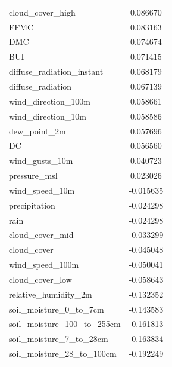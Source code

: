 \begin{table}[H]
\begin{tabular}{lc}
		cloud\_cover\_high                      & 0.086670    \\ 
		FFMC                                     & 0.083163    \\ 
		DMC                                      & 0.074674    \\ 
		BUI                                      & 0.071415    \\ 
		diffuse\_radiation\_instant             & 0.068179    \\ 
		diffuse\_radiation                      & 0.067139    \\ 
		wind\_direction\_100m                    & 0.058661    \\ 
		wind\_direction\_10m                     & 0.058586    \\ 
		dew\_point\_2m                          & 0.057696    \\ 
		DC                                       & 0.056560    \\ 
		wind\_gusts\_10m                         & 0.040723    \\ 
		pressure\_msl                            & 0.023026    \\ 
		wind\_speed\_10m                        & -0.015635   \\ 
		precipitation                          & -0.024298   \\ 
		rain                                   & -0.024298   \\ 
		cloud\_cover\_mid                      & -0.033299   \\ 
		cloud\_cover                           & -0.045048   \\ 
		wind\_speed\_100m                      & -0.050041   \\ 
		cloud\_cover\_low                      & -0.058643   \\ 
		relative\_humidity\_2m                 & -0.132352   \\ 
		soil\_moisture\_0\_to\_7cm             & -0.143583   \\ 
		soil\_moisture\_100\_to\_255cm         & -0.161813   \\ 
		soil\_moisture\_7\_to\_28cm            & -0.163834   \\ 
		soil\_moisture\_28\_to\_100cm          & -0.192249   \\ 
	\end{tabular}
\end{table}

